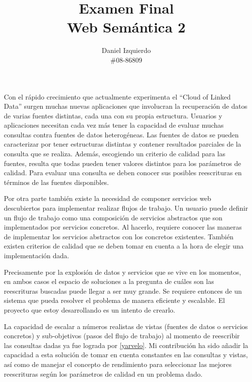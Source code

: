 \documentclass[12pt]{article}
\begin{document}

\author{Daniel Izquierdo \\ \#08-86809}
\title{Examen Final \\ Web Semántica 2}
\maketitle


Con el rápido crecimiento que actualmente experimenta el ``Cloud of Linked
Data'' surgen muchas nuevas aplicaciones que involucran la recuperación de datos
de varias fuentes distintas, cada una con su propia estructura. Usuarios y
aplicaciones necesitan cada vez más tener la capacidad de evaluar muchas consultas
contra fuentes de datos heterogéneas. Las fuentes de datos se pueden
caracterizar por tener estructuras distintas y contener resultados parciales de
la consulta que se realiza. Además, escogiendo un criterio de calidad para las
fuentes, resulta que todas pueden tener valores distintos para los parámetros de
calidad. Para evaluar una consulta se deben conocer sus posibles reescrituras en
términos de las fuentes disponibles.

Por otra parte también existe la necesidad de componer servicios web
descubiertos para implementar realizar flujos de trabajo. Un usuario puede
definir un flujo de trabajo como una composición de servicios abstractos que son
implementados por servicios concretos. Al hacerlo, requiere conocer las maneras
de implementar los servicios abstractos con los concretos existentes. También
existen criterios de calidad que se deben tomar en cuenta a la hora de elegir
una implementación dada.

Precisamente por la explosión de datos y servicios que se vive en los momentos,
en ambos casos el espacio de soluciones a la pregunta de cuáles son las
reescrituras buscadas puede llegar a ser muy grande. Se requiere entonces de un
sistema que pueda resolver el problema de manera eficiente y escalable. El
proyecto que estoy desarrollando es un intento de crearlo.

La capacidad de escalar a números realistas de vistas (fuentes de datos o
servicios concretos) y sub-objetivos (pasos del flujo de trabajo) al momento de
reescribir las consultas dadas ya fue lograda por \ref{yarvelo}. Mi contribución
ha sido añadir la capacidad a esta solución de tomar en cuenta constantes en las
consultas y vistas, así como de manejar el concepto de rendimiento para
seleccionar las mejores reescrituras según los parámetros de calidad en un
problema dado.


\end{document}
